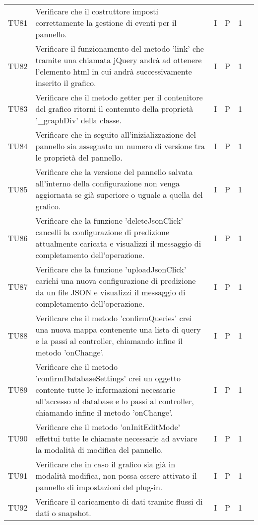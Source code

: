 \begin{longtable} {
		>{}p{12mm}
		>{}p{79.5mm}
		>{}p{9mm}
		>{}p{8mm}
		>{}p{14mm}
		>{}p{0mm}}
	TU81		& Verificare che il costruttore imposti correttamente la gestione di eventi per il pannello.& I & P & 1 &\TBstrut \\ [2mm]
	TU82		& Verificare il funzionamento del metodo 'link' che tramite una chiamata jQuery andrà ad ottenere l'elemento html in cui andrà successivamente inserito il grafico.& I & P & 1 &\TBstrut \\ [2mm]
	TU83		& Verificare che il metodo getter per il contenitore del grafico ritorni il contenuto della proprietà '\_graphDiv' della classe.& I & P & 1 &\TBstrut \\ [2mm]
	TU84		& Verificare che in seguito all'inizializzazione del pannello sia assegnato un numero di versione tra le proprietà del pannello.& I & P & 1 &\TBstrut \\ [2mm]
	TU85		& Verificare che la versione del pannello salvata all'interno della configurazione non venga aggiornata se già superiore o uguale a quella del grafico.& I & P & 1 &\TBstrut \\ [2mm]
	TU86		& Verificare che la funzione 'deleteJsonClick' cancelli la configurazione di predizione attualmente caricata e visualizzi il messaggio di completamento dell'operazione.& I & P & 1 &\TBstrut \\ [2mm]
	TU87		& Verificare che la funzione 'uploadJsonClick' carichi una nuova configurazione di predizione da un file JSON e visualizzi il messaggio di completamento dell'operazione.& I & P & 1 &\TBstrut \\ [2mm]
	TU88		& Verificare che il metodo 'confirmQueries' crei una nuova mappa contenente una lista di query e la passi al controller, chiamando infine il metodo 'onChange'.& I & P & 1 &\TBstrut \\ [2mm]
	TU89		& Verificare che il metodo 'confirmDatabaseSettings' crei un oggetto contente tutte le informazioni necessarie all'accesso al database e lo passi al controller, chiamando infine il metodo 'onChange'.& I & P & 1 &\TBstrut \\ [2mm]
	TU90		& Verificare che il metodo 'onInitEditMode' effettui tutte le chiamate necessarie ad avviare la modalità di modifica del pannello.& I & P & 1 &\TBstrut \\ [2mm]
	TU91		& Verificare che in caso il grafico sia già in modalità modifica, non possa essere attivato il pannello di impostazioni del plug-in.& I & P & 1 &\TBstrut \\ [2mm]
	TU92		& Verificare il caricamento di dati tramite flussi di dati o snapshot.& I & P & 1 &\TBstrut \\ [2mm]

\end{longtable}
